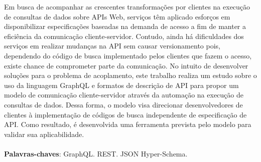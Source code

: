 \begin{resumo}
Em busca de acompanhar as crescentes transformações por clientes na execução de consultas de dados sobre APIs Web, serviços têm aplicado esforços em disponibilizar especificações baseadas na demanda de acesso a fim de manter a eficiência da comunicação cliente-servidor. Contudo, ainda há dificuldades dos serviços em realizar mudanças na API sem causar versionamento pois, dependendo do código de busca implementado pelos clientes que fazem o acesso, existe chance de comprometer parte da comunicação. No intuito de desenvolver soluções para o problema de acoplamento, este trabalho realiza um estudo sobre o uso da linguagem GraphQL e formatos de descrição de API para propor um modelo de comunicação cliente-servidor através da automação na execução de consultas de dados. Dessa forma, o modelo visa direcionar desenvolvedores de clientes à implementação de códigos de busca independente de especificação de API. Como resultado, é desenvolvida uma ferramenta prevista pelo modelo para validar sua aplicabilidade. \\ \\
  \textbf{Palavras-chaves}: GraphQL. REST. JSON Hyper-Schema.
\end{resumo}

